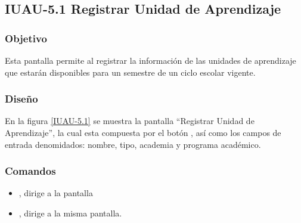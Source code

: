 \subsection{IUAU-5.1 Registrar Unidad de Aprendizaje}

\subsubsection{Objetivo}

	
    Esta pantalla permite al  registrar la información de las unidades de aprendizaje que estarán disponibles para un semestre de un ciclo escolar vigente.
\subsubsection{Diseño}


    En la figura \ref{IUAU-5.1} se muestra la pantalla ``Registrar Unidad de Aprendizaje'', la cual esta compuesta por el botón , así como los campos de entrada denomidados: nombre, tipo, academia y programa académico.
     



\subsubsection{Comandos}
    \begin{itemize}
	\item {}, dirige a la pantalla 
	\item {}, dirige a la misma pantalla.
    \end{itemize}
